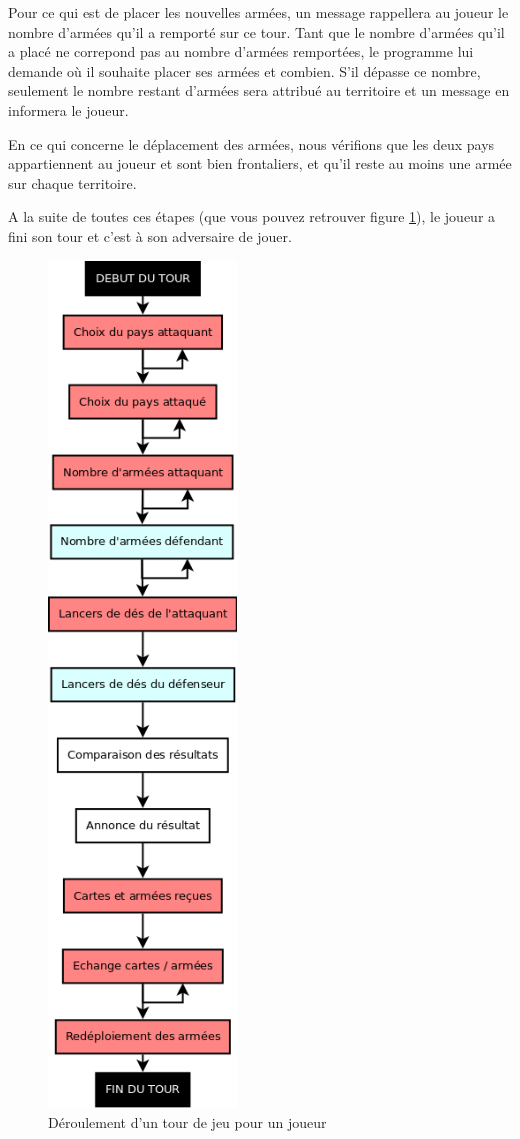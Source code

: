 \begin{enumerate}
    Pour ce qui est de placer les nouvelles armées, un message rappellera au joueur le nombre d'armées qu'il a remporté sur ce tour. Tant que le nombre d'armées qu'il a placé ne correpond pas au nombre d'armées remportées, le programme lui demande où il souhaite placer ses armées et combien. S'il dépasse ce nombre, seulement le nombre restant d'armées sera attribué au territoire et un message en informera le joueur.
    
    En ce qui concerne le déplacement des armées, nous vérifions que les deux pays appartiennent au joueur et sont bien frontaliers, et qu'il reste au moins une armée sur chaque territoire.
    
\end{enumerate}
\vspace{0.2cm}
A la suite de toutes ces étapes (que vous pouvez retrouver figure \ref{fig:tour de jeu}), le joueur a fini son tour et c'est à son adversaire de jouer.

\begin{figure}[!htbp]
    \centering
    \includegraphics[width=5cm]{Images/tour_jeu.png}
    \caption{Déroulement d'un tour de jeu pour un joueur}
    \label{fig:tour de jeu}
\end{figure}


